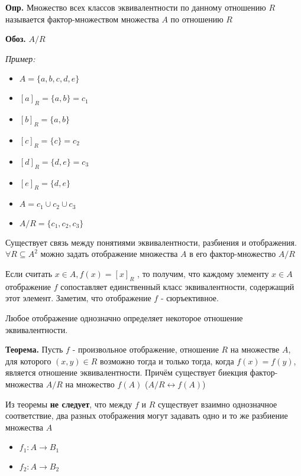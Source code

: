\documentclass[10pt]{article}
\begin{document}
\par\textbf{Опр.} Множество всех классов эквивалентности по данному отношению $R$ называется фактор-множеством множества $A$ по отношению $R$
\par\textbf{Обоз.} $A / R$
\par\textit{Пример:}
\begin{itemize}
    \item $A = \{ a, b, c, d, e\}$
    \item $[a]_{R} = \{ a, b \} = c_{1}$
    \item $[b]_{R} = \{ a, b \}$
    \item $[c]_{R} = \{ c \} = c_{2}$
    \item $[d]_{R} = \{ d, e \} = c_{3}$
    \item $[e]_{R} = \{ d, e \}$
    \item $A = c_{1} \cup c_{2} \cup c_{3}$
    \item $A / R = \{ c_{1}, c_{2}, c_{3} \}$
\end{itemize}
\par Существует связь между понятиями эквивалентности, разбиения и отображения. $\forall R \subseteq A^2$ можно задать отображение множества $A$ в его фактор-множество $A / R$
\par Если считать $x \in A, f(x) = [x]_{R}$ , то получим, что каждому элементу $x \in A$ отображение $f$ сопоставляет единственный класс эквивалентности, содержащий этот элемент. Заметим, что отображение $f$ - сюръективное.
\par Любое отображение однозначно определяет некоторое отношение эквивалентности.
\par\textbf{Теорема.} Пусть $f$ - произвольное отображение, отношение $R$ на множестве $A$, для которого $(x, y) \in R$ возможно тогда и только тогда, когда $f(x) = f(y)$, является отношение эквивалентности. Причём существует биекция фактор-множества $A / R$ на множество $f(A)$ ($A / R \leftrightarrow f(A)$)
\par Из теоремы \textbf{не следует}, что между $f$ и $R$ существует взаимно однозначное соответствие, два разных отображения могут задавать одно и то же разбиение множества $A$
\begin{itemize}
    \item $f_{1}: A \to B_{1}$
    \item $f_{2}: A \to B_{2}$
\end{itemize}
\end{document}
